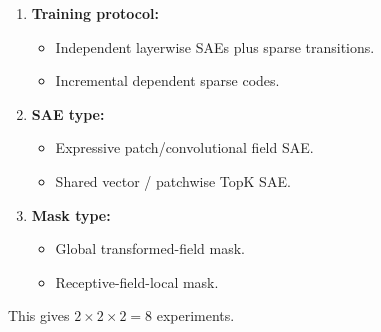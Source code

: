 \documentclass[11pt]{article}
\begin{document}
\begin{enumerate}[leftmargin=*]
    \item \textbf{Training protocol:}
    \begin{itemize}
        \item Independent layerwise SAEs plus sparse transitions.
        \item Incremental dependent sparse codes.
    \end{itemize}

    \item \textbf{SAE type:}
    \begin{itemize}
        \item Expressive patch/convolutional field SAE.
        \item Shared vector / patchwise TopK SAE.
    \end{itemize}

    \item \textbf{Mask type:}
    \begin{itemize}
        \item Global transformed-field mask.
        \item Receptive-field-local mask.
    \end{itemize}
\end{enumerate}

This gives \(2\times 2\times 2=8\) experiments.
\end{document}
